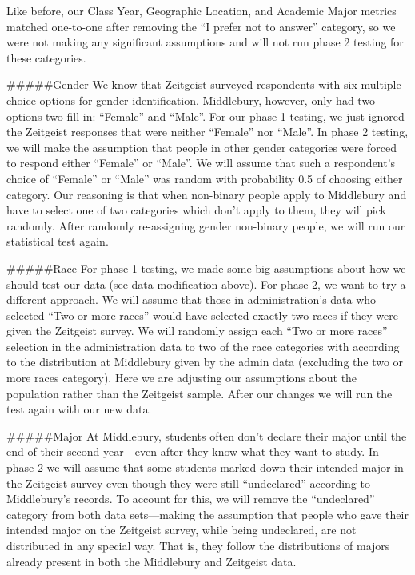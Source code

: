 \documentclass[
]{article}
\begin{document}
Like before, our Class Year, Geographic Location, and Academic Major
metrics matched one-to-one after removing the ``I prefer not to answer''
category, so we were not making any significant assumptions and will not
run phase 2 testing for these categories.

\#\#\#\#\#Gender We know that Zeitgeist surveyed respondents with six
multiple-choice options for gender identification. Middlebury, however,
only had two options two fill in: ``Female'' and ``Male''. For our phase
1 testing, we just ignored the Zeitgeist responses that were neither
``Female'' nor ``Male''. In phase 2 testing, we will make the assumption
that people in other gender categories were forced to respond either
``Female'' or ``Male''. We will assume that such a respondent's choice
of ``Female'' or ``Male'' was random with probability 0.5 of choosing
either category. Our reasoning is that when non-binary people apply to
Middlebury and have to select one of two categories which don't apply to
them, they will pick randomly. After randomly re-assigning gender
non-binary people, we will run our statistical test again.

\#\#\#\#\#Race For phase 1 testing, we made some big assumptions about
how we should test our data (see data modification above). For phase 2,
we want to try a different approach. We will assume that those in
administration's data who selected ``Two or more races'' would have
selected exactly two races if they were given the Zeitgeist survey. We
will randomly assign each ``Two or more races'' selection in the
administration data to two of the race categories with according to the
distribution at Middlebury given by the admin data (excluding the two or
more races category). Here we are adjusting our assumptions about the
population rather than the Zeitgeist sample. After our changes we will
run the test again with our new data.

\#\#\#\#\#Major At Middlebury, students often don't declare their major
until the end of their second year---even after they know what they want
to study. In phase 2 we will assume that some students marked down their
intended major in the Zeitgeist survey even though they were still
``undeclared'' according to Middlebury's records. To account for this,
we will remove the ``undeclared'' category from both data sets---making
the assumption that people who gave their intended major on the
Zeitgeist survey, while being undeclared, are not distributed in any
special way. That is, they follow the distributions of majors already
present in both the Middlebury and Zeitgeist data.
\end{document}
